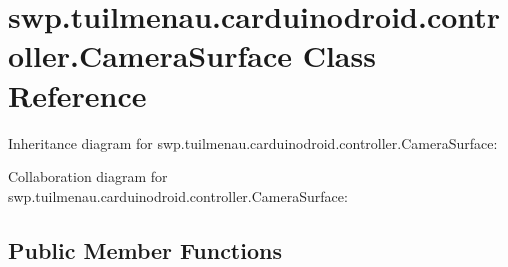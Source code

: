 \hypertarget{classswp_1_1tuilmenau_1_1carduinodroid_1_1controller_1_1_camera_surface}{}\section{swp.\+tuilmenau.\+carduinodroid.\+controller.\+Camera\+Surface Class Reference}
\label{classswp_1_1tuilmenau_1_1carduinodroid_1_1controller_1_1_camera_surface}


Inheritance diagram for swp.\+tuilmenau.\+carduinodroid.\+controller.\+Camera\+Surface\+:


Collaboration diagram for swp.\+tuilmenau.\+carduinodroid.\+controller.\+Camera\+Surface\+:
\subsection*{Public Member Functions}
